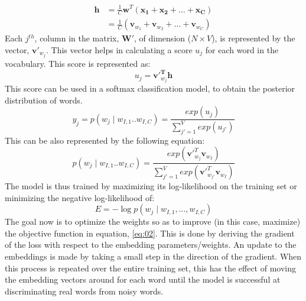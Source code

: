 \begin{equation}\label{eq:01}
\begin{split}
\mathbf{h} & = \frac{1}{C} \mathbf{w}^T(\mathbf{x_1+x_2+...+x_C})\\
& = \frac{1}{C}(\mathbf{v}_{w_1}+\mathbf{v}_{w_2}+...+\mathbf{v}_{w_C})
\end{split}
\end{equation}
Each $\mathit{j^{th}}$, column in the matrix, $\mathbf{W'}$, of dimension ($N\times V$), is represented by the vector, $\mathbf{v'}_{w_{j}}$. This vector helps in calculating a score $\mathit{u_j}$ for each word in the vocabulary. This score is represented as:
\begin{equation}
\mathit{u_j} = \mathbf{v'}_{w_{j}}^{\mathbf{T}}\mathbf{h}
\end{equation}
This score can be used in a softmax classification model, to obtain the posterior distribution of words.
\begin{equation}
\mathit{y_j} = \mathit{p(w_j \mid w_{I,1}..w_{I,C})} = \dfrac{exp(u_j)}{\sum_{j'=1}^{V}exp(u_{j'})}
\end{equation}
This can be also represented by the following equation:
\begin{equation}\label{eq:02}
\mathit{p(w_j \mid w_{I,1}..w_{I,C})} =\dfrac{exp(\mathbf{v'}^T_{w_{j}} \mathbf{v}_{w_{I}})}{\sum_{j'=1}^{V}exp(\mathbf{v'}^T_{w_{j'}} \mathbf{v}_{w_{I}})}
\end{equation}
The model is thus trained by maximizing its log-likelihood on the training set or minimizing the negative log-likelihood of:
\begin{equation}
E = - \log p(w_j\mid w_{I,1},...,w_{I,C})
\end{equation}
The goal now is to optimize the weights so as to improve (in this case, maximize) the objective function in equation, \ref{eq:02}. This is done by deriving the gradient of the loss with respect to the embedding parameters/weights. An update to the embeddings is made by taking a small step in the direction of the gradient. When this process is repeated over the entire training set, this has the effect of moving the embedding vectors around for each word until the model is successful at discriminating real words from noisy words.
